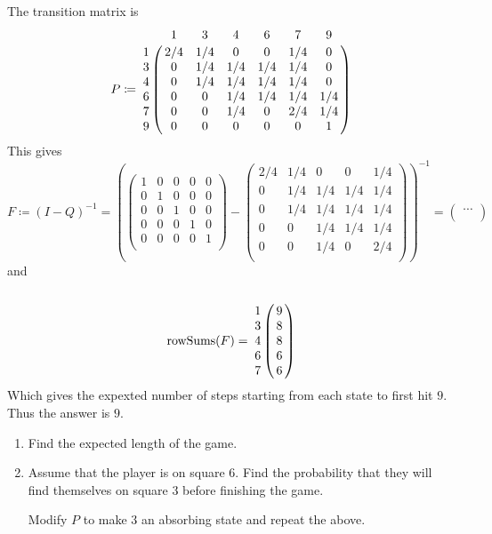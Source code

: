 \documentclass{article}
\DeclareMathOperator\rowSums{rowSums}
\begin{document}
The transition matrix is
\begin{equation}
	P \coloneqq \bordermatrix{~ & 1 & 3 & 4 & 6 & 7 & 9 \cr
		1 & 2/4 & 1/4 & 0 & 0 & 1/4 & 0 \cr
		3 & 0 & 1/4 & 1/4 & 1/4 & 1/4 & 0 \cr
		4 & 0 & 1/4 & 1/4 & 1/4 & 1/4 & 0 \cr
		6 & 0 & 0 & 1/4 & 1/4 & 1/4 & 1/4 \cr
		7 & 0 & 0 & 1/4 & 0 & 2/4 & 1/4 \cr
		9 & 0 & 0 & 0 & 0 & 0 & 1 \cr
		}
\end{equation}
This gives
$$ F \coloneqq (I - Q)^{-1} = \left(\begin{pmatrix}
		1 & 0 & 0 & 0 & 0 \\
		0 & 1 & 0 & 0 & 0 \\
		0 & 0 & 1 & 0 & 0 \\
		0 & 0 & 0 & 1 & 0 \\
		0 & 0 & 0 & 0 & 1 \\
\end{pmatrix} - \begin{pmatrix}
		2/4 & 1/4 & 0 & 0 & 1/4 \\
		0 & 1/4 & 1/4 & 1/4 & 1/4 \\
		0 & 1/4 & 1/4 & 1/4 & 1/4 \\
		0 & 0 & 1/4 & 1/4 & 1/4 \\
		0 & 0 & 1/4 & 0 & 2/4 \\
\end{pmatrix}\right)^{-1}
	= \begin{pmatrix}
		\cdots \\
	\end{pmatrix}
	$$
and
$$ \rowSums(F) = \bordermatrix{
	~ & ~ \cr
	1 & 9 \cr
	3 & 8 \cr
	4 & 8 \cr
	6 & 6 \cr
	7 & 6 \cr
	}
	$$
Which gives the expexted number of steps starting from each state
to first hit $9$.
Thus the answer is $9$.

\begin{enumerate}[label=(\alph*)]
	\item Find the expected length of the game.
	\item Assume that the player is on square 6.
		Find the probability that they will find themselves on square 3 before finishing the game.

		Modify $P$ to make $3$ an absorbing state and repeat the above.
\end{enumerate}
\end{document}
